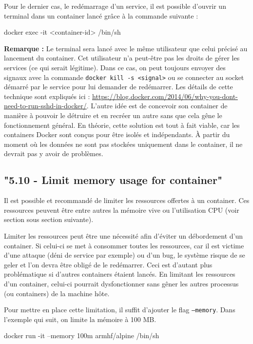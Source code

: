\documentclass[11pt,a4paper,oneside]{report}
\newcommand{\code}[1]{\texttt{#1}}
\begin{document}
Pour le dernier cas, le redémarrage d'un service, il est possible d'ouvrir un terminal dans un container lancé grâce à la commande suivante :
\begin{bashcode}
docker exec -it <container-id> /bin/sh
\end{bashcode}

\textbf{Remarque : } Le terminal sera lancé avec le même utilisateur que celui précisé au lancement du container. Cet utilisateur n'a peut-être pas les droits de gérer les services (ce qui serait légitime). Dans ce cas, on peut toujours envoyer des signaux avec la commande \code{docker kill -s <signal>} ou se connecter au socket démarré par le service pour lui demander de redémarrer. Les détails de cette technique sont expliqués ici : \url{https://blog.docker.com/2014/06/why-you-dont-need-to-run-sshd-in-docker/}. L'autre idée est de concevoir son container de manière à pouvoir le détruire et en recréer un autre sans que cela gêne le fonctionnement général. En théorie, cette solution est tout à fait viable, car les containers Docker sont conçus pour être isolés et indépendants. À partir du moment où les données ne sont pas stockées uniquement dans le container, il ne devrait pas y avoir de problèmes.

\subsection{"5.10 - Limit memory usage for container"}\label{limit_memory_usage}
Il est possible et recommandé de limiter les ressources offertes à un container. Ces ressources peuvent être entre autres la mémoire vive ou l'utilisation CPU (voir section sous section suivante).

Limiter les ressources peut être une nécessité afin d'éviter un débordement d'un container. Si celui-ci se met à consommer toutes les ressources, car il est victime d'une attaque (déni de service par exemple) ou d'un bug, le système risque de se geler et l'on devra être obligé de le redémarrer. Ceci est d'autant plus problématique si d'autres containers étaient lancés. En limitant les ressources d'un container, celui-ci pourrait dysfonctionner sans gêner les autres processus (ou containers) de la machine hôte.

Pour mettre en place cette limitation, il suffit d'ajouter le flag \code{--memory}. Dans l'exemple qui suit, on limite la mémoire à 100 MB.

\begin{bashcode}
docker run -it --memory 100m armhf/alpine /bin/sh
\end{bashcode}
\end{document}

